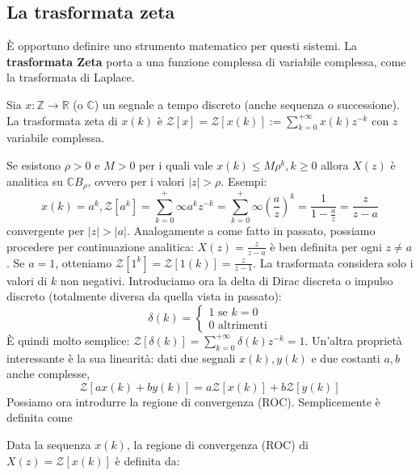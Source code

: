 \documentclass[11pt]{article}
\begin{document}
\subsection{La trasformata zeta}
È opportuno definire uno strumento matematico per questi sistemi. La \textbf{trasformata Zeta} porta a una funzione complessa di variabile complessa, come la trasformata di Laplace.
\begin{center}
    Sia $x:\mathbb{Z}\rightarrow\mathbb{R}$ (o $\mathbb{C}$) un segnale a tempo discreto (anche sequenza o successione). La trasformata zeta di $x(k)$ è $\mathcal{Z}[x] = \mathcal{Z}[x(k)]:=\sum_{k=0}^{+\infty} x(k)z^{-k}$ con $z$ variabile complessa.
\end{center}
Se esistono $\rho>0$ e $M>0$ per i quali vale $x(k)\le M\rho^k, k\ge0$ allora $X(z)$ è analitica su $\mathbb{C}B_\rho$, ovvero per i valori $|z|>\rho$.
Esempi:
\begin{displaymath}
    x(k)=a^k,\mathcal{Z}[a^k]=\sum_{k=0}^+\infty a^kz^{-k}=\sum_{k=0}^+\infty \left(\frac{a}{z}\right)^k = \frac{1}{1-\frac{a}{z}} = \frac{z}{z-a}
\end{displaymath}
convergente per $|z|>|a|$. Analogamente a come fatto in passato, possiamo procedere per continuazione analitica: $X(z)=\frac{z}{z-a}$ è ben definita per ogni $z\neq a$. Se $a=1$, otteniamo $\mathcal{Z}[1^k]=\mathcal{Z}[1(k)]=\frac{z}{z-1}$. La trasformata considera solo i valori di $k$ non negativi. Introduciamo ora la delta di Dirac discreta o impulso discreto (totalmente diversa da quella vista in passato):
\begin{displaymath}
    \delta(k)=\begin{cases}
        1 \textrm{ se }k=0 \\
        0 \textrm{ altrimenti}
    \end{cases}
\end{displaymath}
È quindi molto semplice: $\mathcal{Z}[\delta(k)]=\sum_{k=0}^{+\infty}\delta(k)z^{-k}=1$. Un'altra proprietà interessante è la sua linearità: dati due segnali $x(k), y(k)$ e due costanti $a,b$ anche complesse,\begin{displaymath}
    \mathcal{Z}[ax(k)+by(k)]=a\mathcal{Z}[x(k)]+b\mathcal{Z}[y(k)]
\end{displaymath}
Possiamo ora introdurre la regione di convergenza (ROC). Semplicemente è definita come
\begin{center}
    Data la sequenza $x(k)$, la regione di convergenza (ROC) di $X(z)=\mathcal{Z}[x(k)]$ è definita da:
\end{center}
\end{document}
